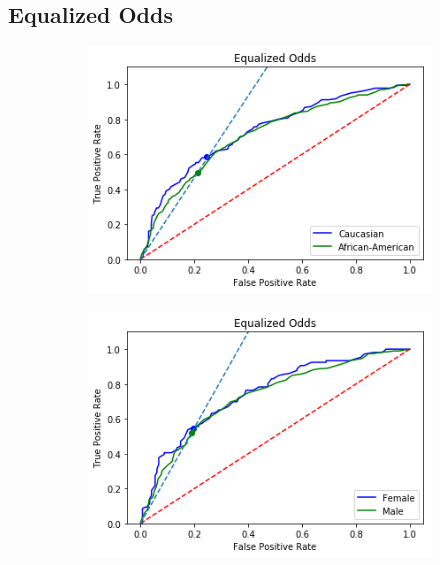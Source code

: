 \documentclass[11pt, fleqn, titlepage]{article}
\begin{document}
	\subsection{Equalized Odds}\label{equalizedOdds}
	
	\begin{figure}[H]
		\centering
		\begin{subfigure}{0.5\textwidth}
			\centering
			\includegraphics[width=0.9\linewidth]{"imgs/Equalized Odds Optimal"}
		\end{subfigure}%
		\begin{subfigure}{0.5\textwidth}
			\centering
			\includegraphics[width=0.9\linewidth]{"imgs/Equalized Odds Optimal_sex"}
		\end{subfigure}
	

\end{figure}
\end{document}
